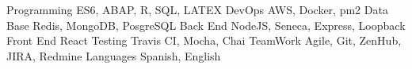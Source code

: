 


\begin{cvskills}

\cvskill
{Programming} %
{ES6, ABAP, R, SQL, LATEX} %
\cvskill
{DevOps} %
{AWS, Docker, pm2} %
\cvskill
{Data Base} %
{Redis, MongoDB, PosgreSQL} %
\cvskill
{Back End} %
{NodeJS,  Seneca, Express, Loopback} %
\cvskill
{Front End} %
{React} %
\cvskill
{Testing} %
{Travis CI, Mocha, Chai} %
\cvskill
{TeamWork} %
{Agile, Git, ZenHub, JIRA, Redmine} %
\cvskill
{Languages} %
{Spanish, English} %
\end{cvskills}
